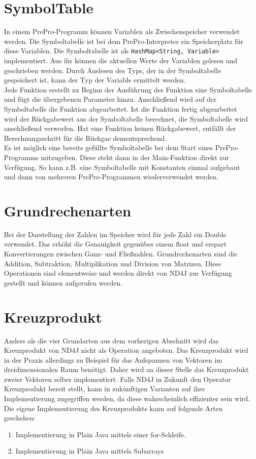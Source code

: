 \section{SymbolTable}
In einem PrePro-Programm können Variablen als Zwischenspeicher verwendet werden.
Die Symboltabelle ist bei dem PrePro-Interpreter ein Speicherplatz für diese Variablen.
Die Symboltabelle ist als \texttt{HashMap<String, Variable>} implementiert.
Aus ihr können die aktuellen Werte der Variablen gelesen und geschrieben werden.
Durch Auslesen des Typs, der in der Symboltabelle gespeichert ist, kann der Typ der Variable ermittelt werden.\\
Jede Funktion erstellt zu Beginn der Ausführung der Funktion eine Symboltabelle und fügt die übergebenen Parameter hinzu.
Anschließend wird auf der Symboltabelle die Funktion abgearbeitet.
Ist die Funktion fertig abgearbeitet wird der Rückgabewert aus der Symboltabelle berechnet, die Symboltabelle wird anschließend verworfen.
Hat eine Funktion keinen Rückgabewert, entfällt der Berechnungsschritt für die Rückgae dementsprechend.
\\
Es ist möglich eine bereits gefüllte Symboltabelle bei dem Start eines PrePro-Programms mitzugeben.
Diese steht dann in der Main-Funktion direkt zur Verfügung.
So kann z.B. eine Symboltabelle mit Konstanten einmal aufgebaut und dann von mehreren PrePro-Programmen wiederverwendet werden.

\section{Grundrechenarten}
Bei der Darstellung der Zahlen im Speicher wird für jede Zahl ein Double verwendet.
Das erhöht die Genauigkeit gegenüber einem float und erspart Konvertierungen zwischen Ganz- und Fließzahlen.
Grundrechenarten sind die Addition, Subtraktion, Multiplikation und Division von Matrizen.
Diese Operationen sind elementweise und werden direkt von ND4J zur Verfügung gestellt und können aufgerufen werden.

\section{Kreuzprodukt}
Anders als die vier Grundarten aus dem vorherigen Abschnitt wird das Kreuzprodukt von ND4J nicht als Operation angeboten.
Das Kreuzprodukt wird in der Praxis allerdings zu Beispiel für das Aufspannen von Vektoren im dreidimensionalen Raum benötigt.
Daher wird an dieser Stelle das Kreuzprodukt zweier Vektoren selber implementiert.
Falls ND4J in Zukunft den Operator Kreuzprodukt bereit stellt, kann in zukünftigen Varianten auf ihre Implementierung zugegriffen werden, da diese wahrscheinlich effizienter sein wird.
Die eigene Implementierung des Kreuzprodukts kann auf folgende Arten geschehen:
\begin{enumerate}
	\item Implementierung in Plain Java mittels einer for-Schleife.
	\item Implementierung in Plain Java mittels Subarrays
\end{enumerate}

